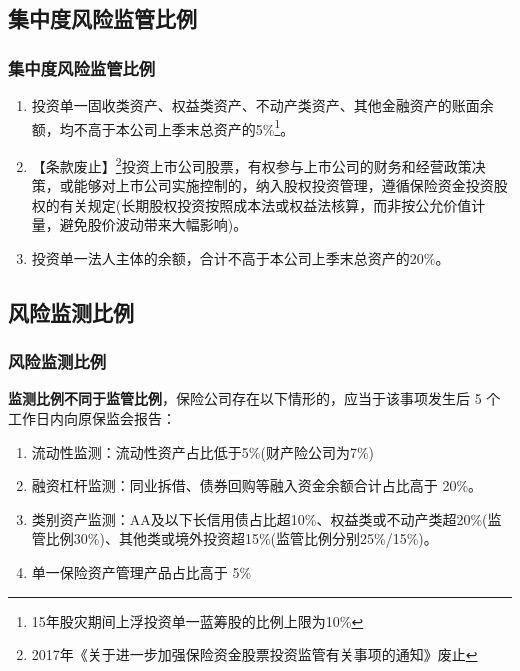 \documentclass[a4paper,12pt]{ctexbeamer}
\begin{document}
\subsection{集中度风险监管比例}
\begin{frame}
    \frametitle{集中度风险监管比例}
    \begin{enumerate}
        \item 投资单一固收类资产、权益类资产、不动产类资产、其他金融资产的账面余额，均不高于本公司上季末总资产的5\%\footnote{15年股灾期间上浮投资单一蓝筹股的比例上限为10\%}。
        \item 【条款废止】\footnote{2017年《关于进一步加强保险资金股票投资监管有关事项的通知》废止}投资上市公司股票，有权参与上市公司的财务和经营政策决策，或能够对上市公司实施控制的，纳入股权投资管理，遵循保险资金投资股权的有关规定(长期股权投资按照成本法或权益法核算，而非按公允价值计量，避免股价波动带来大幅影响)。
        \item 投资单一法人主体的余额，合计不高于本公司上季末总资产的20\%。
    \end{enumerate}
\end{frame}
\subsection{风险监测比例}
\begin{frame}
    \frametitle{风险监测比例}
    \textbf{监测比例不同于监管比例}，保险公司存在以下情形的，应当于该事项发生后 5 个工作日内向原保监会报告：
    \begin{enumerate}
        \item 流动性监测：流动性资产占比低于5\%(财产险公司为7\%)
        \item 融资杠杆监测：同业拆借、债券回购等融入资金余额合计占比高于 20\%。
        \item 类别资产监测：AA及以下长信用债占比超10\%、权益类或不动产类超20\%(监管比例30\%)、其他类或境外投资超15\%(监管比例分别25\%/15\%)。
        \item 单一保险资产管理产品占比高于 5\%
    \end{enumerate}
\end{frame}
\end{document}
